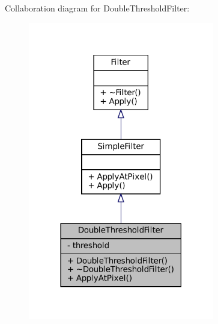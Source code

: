 Collaboration diagram for Double\+Threshold\+Filter\+:\nopagebreak
\begin{figure}[H]
\begin{center}
\leavevmode
\includegraphics[width=230pt]{classDoubleThresholdFilter__coll__graph}
\end{center}
\end{figure}
